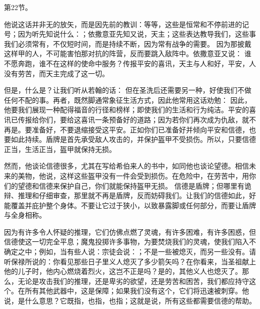 第22节。\par

他说这话并非无的放矢，而是因先前的教训：等等，这些是恒常和不停前进的记号；因为听先知说什么：；依撒意亚先知又说，天主；这些表达教导我们，这些事我们必须常有，不仅短时间，而是持续不断，因为常有战争的需要。 因为那披戴这样甲的人，不可能害怕那对抗的阵营，反而要跳入敌阵中。依撒意亚又说： 谁不愿奔跑，谁不在这样的使命中服务？传报平安的喜讯，天主与人和好，平安，人没有劳苦，而天主完成了这一切。\par

但是，什么是？让我们听从若翰的话： 但在圣洗后还需要另一种，好使我们不做任何不配的事。再者，既然脚通常象征生活方式，因此他常用这话劝勉： 因此，他要我们展现一种配得福音的行径和榜样；即使我们的生活和行为纯洁。平安的喜讯已传报给你们，要给这喜讯一条预备好的道路；因为若你们再次成为仇敌，就不再是。要准备好，不要退缩接受这平安。正如你们已准备好并倾向平安和信德，也要如此持续。盾牌是首先承受敌人攻击的，并保护盔甲不受损伤。所以，只要信德正当，生活正当，盔甲就保持无损。\par

然而，他谈论信德很多，尤其在写给希伯来人的书中，如同他也谈论望德。相信未来的美物，他说，这样这些盔甲没有一件会受到损伤。在危险中，在劳苦中，用你们的望德和信德来保护自己，你们就能保持盔甲无损。 信德是盾牌；但哪里有诡辩、推理和仔细审查，那里就不再是盾牌，反而妨碍我们。让我们的信德如此，好能覆盖并庇护整个身体。不要让它过于狭小，以致暴露脚或任何部分，而要让盾牌与全身相称。\par

因为有许多令人怀疑的推理，它们仿佛点燃了灵魂，有许多困难，有许多困惑，但信德使这一切完全平息；魔鬼投掷许多事物，为要焚烧我们的灵魂，使我们陷入不确定之中；例如，当有些人说：宗徒会说：；不是一些被熄灭，而另一些没有。请听保禄所说的：你看见那些日子里义人熄灭了多少箭矢吗？在你看来，当圣祖献上他的儿子时，他内心燃烧着烈火，这岂不正是吗？是的，其他义人也熄灭了。那么，无论是攻击我们的推理，还是卑劣的欲望，还是劳苦和困苦，我们都应持守这个。在所有其他武器中，这是保障；如果我们没有这个，它们将迅速被刺穿。他说，是什么意思？它既指，也指，也指；这就是说，所有这些都需要信德的帮助。\par

